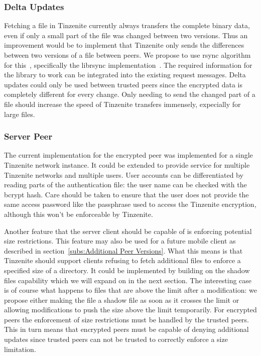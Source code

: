 \subsubsection{Delta Updates}
\label{subs:Delta Updates}

Fetching a file in Tinzenite currently always transfers the complete binary data, even if only a small part of the file was changed between two versions.
Thus an improvement would be to implement that Tinzenite only sends the differences between two versions of a file between peers.
We propose to use rsync algorithm for this~\cite{tridgell1996rsync}, specifically the librsync implementation~\cite{web:site:librsync}.
The required information for the library to work can be integrated into the existing request messages.
Delta updates could only be used between trusted peers since the encrypted data is completely different for every change.
Only needing to send the changed part of a file should increase the speed of Tinzenite transfers immensely, expecially for large files.

\subsubsection{Server Peer}
\label{subs:Server Peer}

The current implementation for the encrypted peer was implemented for a single Tinzenite network instance.
It could be extended to provide service for multiple Tinzenite networks and multiple users.
User accounts can be differentiated by reading parts of the authentication file: the user name can be checked with the bcrypt hash.
Care should be taken to ensure that the user does not provide the same access password like the passphrase used to access the Tinzenite encryption, although this won't be enforceable by Tinzenite.

Another feature that the server client should be capable of is enforcing potential size restrictions.
This feature may also be used for a future mobile client as described in section~\ref{subs:Additional Peer Versions}.
What this means is that Tinzenite should support clients refusing to fetch additional files to enforce a specified size of a directory.
It could be implemented by building on the shadow files capability which we will expand on in the next section.
The interesting case is of course what happens to files that are above the limit after a modification: we propose either making the file a shadow file as soon as it crosses the limit or allowing modifications to push the size above the limit temporarily.
For encrypted peers the enforcement of size restrictions must be handled by the trusted peers.
This in turn means that encrypted peers must be capable of denying additional updates since trusted peers can not be trusted to correctly enforce a size limitation.

